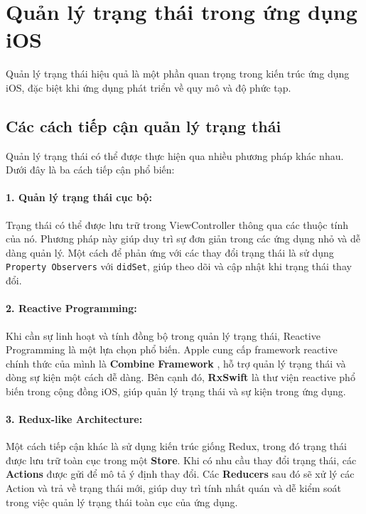 \section{Quản lý trạng thái trong ứng dụng iOS}

\hspace*{0.8cm}Quản lý trạng thái hiệu quả là một phần quan trọng trong kiến trúc ứng dụng iOS, đặc biệt khi ứng dụng phát triển về quy mô và độ phức tạp.

\subsection{Các cách tiếp cận quản lý trạng thái}

\hspace*{0.8cm}Quản lý trạng thái có thể được thực hiện qua nhiều phương pháp khác nhau. Dưới đây là ba cách tiếp cận phổ biến:

\paragraph*{1. Quản lý trạng thái cục bộ:}Trạng thái có thể được lưu trữ trong ViewController thông qua các thuộc tính của nó. Phương pháp này giúp duy trì sự đơn giản trong các ứng dụng nhỏ và dễ dàng quản lý. Một cách để phản ứng với các thay đổi trạng thái là sử dụng \texttt{Property Observers} với \texttt{didSet}, giúp theo dõi và cập nhật khi trạng thái thay đổi.

\paragraph*{2. Reactive Programming:}Khi cần sự linh hoạt và tính đồng bộ trong quản lý trạng thái, Reactive Programming là một lựa chọn phổ biến. Apple cung cấp framework reactive chính thức của mình là \textbf{Combine Framework} \cite{Combine-Framework}, hỗ trợ quản lý trạng thái và dòng sự kiện một cách dễ dàng. Bên cạnh đó, \textbf{RxSwift} là thư viện reactive phổ biến trong cộng đồng iOS, giúp quản lý trạng thái và sự kiện trong ứng dụng.

\paragraph*{3. Redux-like Architecture:}Một cách tiếp cận khác là sử dụng kiến trúc giống Redux, trong đó trạng thái được lưu trữ toàn cục trong một \textbf{Store}. Khi có nhu cầu thay đổi trạng thái, các \textbf{Actions} được gửi để mô tả ý định thay đổi. Các \textbf{Reducers} sau đó sẽ xử lý các Action và trả về trạng thái mới, giúp duy trì tính nhất quán và dễ kiểm soát trong việc quản lý trạng thái toàn cục của ứng dụng.


